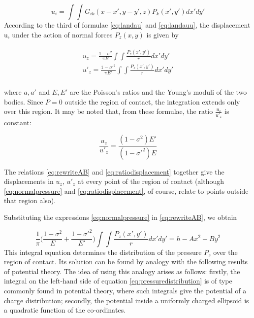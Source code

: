\begin{equation}
u_{i} = \int\int G_{ik} (x - x', y-y', z) P_{k}(x',y') dx' dy'
\label{eq:landauu}
\end{equation}
According to the third of formulae \ref{eq:landau} and \ref{eq:landauu}, the
displacement u, under the action of normal forces $P_{z}(x, y)$ is given by

\begin{align}
\begin{split}
u_{z} = \frac{1-\sigma^{2}}{\pi E}\int\int\frac{P_{z}(x',y')}{r}dx'dy' \\
u'_{z} = \frac{1-\sigma'^{2}}{\pi E'}\int\int\frac{P_{z}(x',y')}{r}dx'dy' \\
\end{split}
\label{eq:normalpressure}
\end{align}

where $a, a'$ and $E, E'$ are the Poisson’s ratios and the Young’s moduli of the two bodies. Since $P = 0$ outside the region of contact, the integration extends only over this region. It may be noted that, from these formulae, the ratio $\frac{u_{z}}{u'_{z}}$ is constant:

\begin{equation}
\frac{u_{z}}{u'_{z}} = \frac{(1-\sigma^{2})E'}{(1-\sigma'^{2})E}
\label{eq:ratiodisplacement}
\end{equation}

The relations \ref{eq:rewriteAB} and \ref{eq:ratiodisplacement} together give the displacements in $u_{z}$, $u'_{z}$ at every point of the region of contact (although \ref{eq:normalpressure} and \ref{eq:ratiodisplacement}, of course, relate to
points outside that region also).

Substituting the expressions \ref{eq:normalpressure} in \ref{eq:rewriteAB}, we obtain

\begin{equation}
\frac{1}{\pi}\Big(\frac{1-\sigma^{2}}{E}+\frac{1-\sigma'^{2}}{E'}\Big)\int\int\frac{P_{z}(x',y')}{r}dx'dy' = h-Ax^{2}-By^{2}
\label{eq:pressuredistribution}
\end{equation}
This integral equation determines the distribution of the pressure $P_{z}$ over the region of contact. Its solution can be found by analogy with the following results of potential theory. The idea of using this analogy arises as follows:
firstly, the integral on the left-hand side of equation \ref{eq:pressuredistribution} is of type commonly found in potential theory, where such integrals give the potential of a
charge distribution; secondly, the potential inside a uniformly charged ellipsoid is a quadratic function of the co-ordinates.

